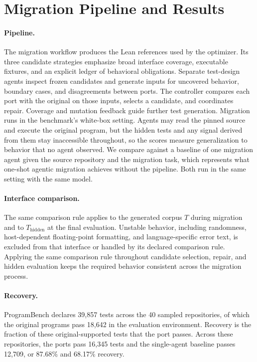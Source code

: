\section{Migration Pipeline and Results}
\label{app:migration}

\paragraph{Pipeline.}
The migration workflow produces the Lean references used by the optimizer.
Its three candidate strategies emphasize broad interface coverage, executable fixtures, and an explicit ledger of behavioral obligations.
Separate test-design agents inspect frozen candidates and generate inputs for uncovered behavior, boundary cases, and disagreements between ports.
The controller compares each port with the original on those inputs, selects a candidate, and coordinates repair.
Coverage and mutation feedback guide further test generation.
Migration runs in the benchmark's white-box setting.
Agents may read the pinned source and execute the original program, but the hidden tests and any signal derived from them stay inaccessible throughout, so the scores measure generalization to behavior that no agent observed.
We compare \aqueduct{} against a baseline of one migration agent given the source repository and the migration task, which represents what one-shot agentic migration achieves without the pipeline.
Both run in the same setting with the same model.

\paragraph{Interface comparison.}
The same comparison rule applies to the generated corpus $T$ during migration and to $T_{\mathrm{hidden}}$ at the final evaluation.
Unstable behavior, including randomness, host-dependent floating-point formatting, and language-specific error text, is excluded from that interface or handled by its declared comparison rule.
Applying the same comparison rule throughout candidate selection, repair, and hidden evaluation keeps the required behavior consistent across the migration process.

\paragraph{Recovery.}
ProgramBench declares 39,857 tests across the 40 sampled repositories, of which the original programs pass 18,642 in the evaluation environment.
Recovery is the fraction of these original-supported tests that the port passes.
Across these repositories, the \aqueduct{} ports pass 16,345 tests and the single-agent baseline passes 12,709, or 87.68\% and 68.17\% recovery.

